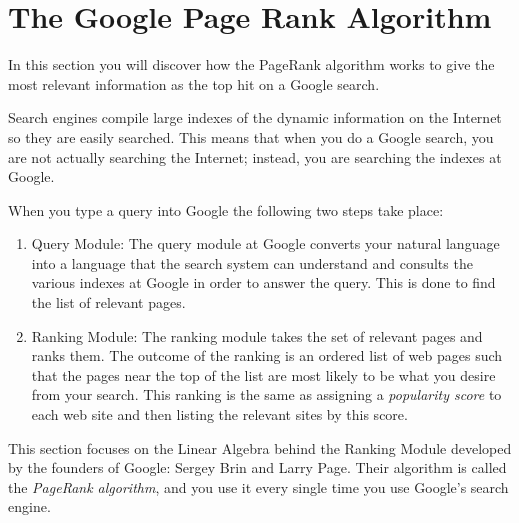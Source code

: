 % 



\newpage\section{The Google Page Rank Algorithm}
In this section you will discover how the PageRank algorithm works to give the most relevant
information as the top hit on a Google search.  

Search engines compile large indexes of the dynamic information on the Internet so they
are easily searched.  This means that when you do a Google search, you are not actually
searching the Internet; instead, you are searching the indexes at Google.

When you type a query into Google the following two steps take place:
\begin{enumerate}
    \item Query Module: The query module at Google converts your natural language into a
        language that the search system can understand and consults the various indexes
        at Google in order to answer the query.  This is done to find the list of relevant
        pages.
    \item Ranking Module: The ranking module takes the set of relevant pages and ranks
        them. The outcome of the ranking is an ordered list of web pages such
        that the pages near the top of the list are most likely to be what you desire from
        your search. This ranking is the same as assigning a {\it popularity score} to
        each web site and then listing the relevant sites by this score.  
\end{enumerate}

This section focuses on the Linear Algebra behind the Ranking Module developed by the
founders of Google: Sergey Brin and Larry Page.  Their algorithm is called the
\emph{PageRank algorithm}, and you use it every single time you use Google's search
engine.


